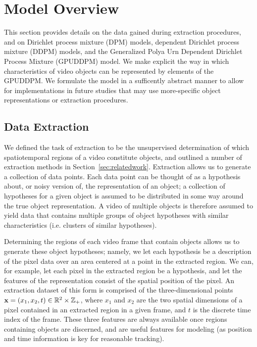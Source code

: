 \documentclass[smallcondensed, final]{svjour3}
\begin{document}

\section{Model Overview}
\label{sec:modeloverview}

This section provides details on the data gained during extraction procedures, and on Dirichlet process mixture (DPM) models, dependent Dirichlet process mixture (DDPM) models, and the Generalized Polya Urn Dependent Dirichlet Process Mixture (GPUDDPM) model. We make explicit the way in which characteristics of video objects can be represented by elements of the GPUDDPM. We formulate the model in a sufficently abstract manner to allow for implementations in future studies that may use more-specific object representations or extraction procedures.






\subsection{Data Extraction}
\label{sec:data}

We defined the task of extraction to be the unsupervised determination of which spatiotemporal regions of a video constitute objects, and outlined a number of extraction methods in Section~\ref{sec:relatedwork}. Extraction allows us to generate a collection of data points. Each data point can be thought of as a hypothesis about, or noisy version of, the representation of an object; a collection of hypotheses for a given object is assumed to be distributed in some way around the true object representation. A video of multiple objects is therefore assumed to yield data that contains multiple groups of object hypotheses with similar characteristics (i.e. clusters of similar hypotheses).

Determining the regions of each video frame that contain objects allows us to generate these object hypotheses; namely, we let each hypothesis be a description of the pixel data over an area centered at a point in the extracted region. We can, for example, let each pixel in the extracted region be a hypothesis, and let the features of the representation consist of the spatial position of the pixel. An extraction dataset of this form is comprised of the three-dimensional points $\bold{x} = ( x_{1}, x_{2}, t ) \in \mathbb{R}^{2} \times \mathbb{Z}_{+}$, where $x_{1}$ and $x_{2}$ are the two spatial dimensions of a pixel contained in an extracted region in a given frame, and $t$ is the discrete time index of the frame. These three features are always available once regions containing objects are discerned, and are useful features for modeling (as position and time information is key for reasonable tracking).
\end{document}
